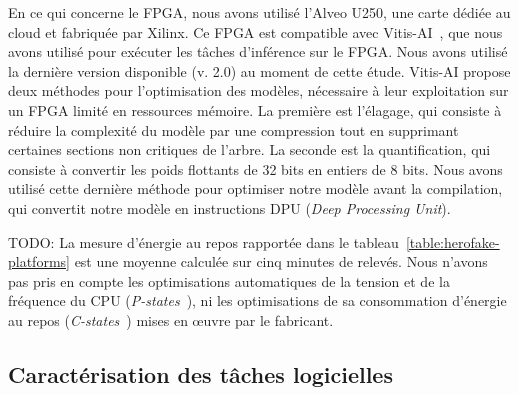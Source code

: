 En ce qui concerne le FPGA, nous avons utilisé l'Alveo U250, une carte dédiée au cloud et fabriquée par Xilinx. Ce FPGA est compatible avec Vitis-AI~\cite{vitis-ai}, que nous avons utilisé pour exécuter les tâches d'inférence sur le FPGA. Nous avons utilisé la dernière version disponible (v. 2.0) au moment de cette étude. Vitis-AI propose deux méthodes pour l'optimisation des modèles, nécessaire à leur exploitation sur un FPGA limité en ressources mémoire. La première est l'élagage, qui consiste à réduire la complexité du modèle par une compression tout en supprimant certaines sections non critiques de l'arbre. La seconde est la quantification, qui consiste à convertir les poids flottants de 32 bits en entiers de 8 bits. Nous avons utilisé cette dernière méthode pour optimiser notre modèle avant la compilation, qui convertit notre modèle en instructions DPU (\textit{Deep Processing Unit}).

TODO: La mesure d'énergie au repos rapportée dans le tableau~\ref{table:herofake-platforms} est une moyenne calculée sur cinq minutes de relevés. Nous n'avons pas pris en compte les optimisations automatiques de la tension et de la fréquence du \gls{CPU} (\textit{P-states}~\cite{}), ni les optimisations de sa consommation d'énergie au repos (\textit{C-states}~\cite{}) mises en œuvre par le fabricant.

\subsection{Caractérisation des tâches logicielles}
\label{section:herofake-offline:workload}

